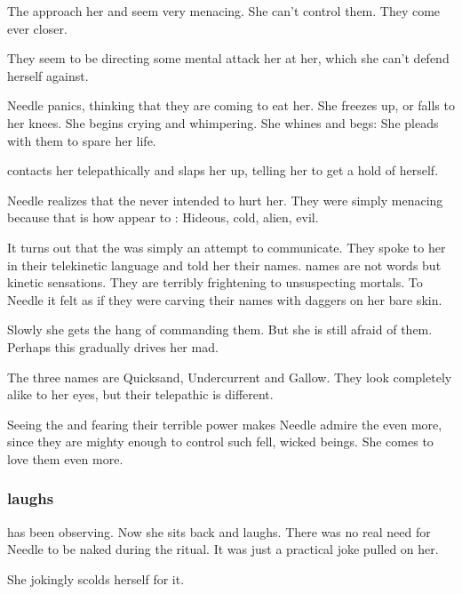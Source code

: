 The \banes{} approach her and seem very menacing. 
She can't control them. 
They come ever closer. 

They seem to be directing some mental attack her at her, which she can't defend herself against. 

Needle panics, thinking that they are coming to eat her. 
She freezes up, or falls to her knees. 
She begins crying and whimpering. 
She whines and begs: 
She pleads with them to spare her life. 

\Achsah{} contacts her telepathically and slaps her up, telling her to get a hold of herself. 

Needle realizes that the \banes{} never intended to hurt her. 
They were simply menacing because that is how \banes{} appear to \humans: 
Hideous, cold, alien, evil. 

It turns out that the \pps{\banes}{}  was simply an attempt to communicate. 
They spoke to her in their telekinetic language and told her their names. 
\Bane{} names are not words but kinetic sensations. 
They are terribly frightening to unsuspecting mortals. 
To Needle it felt as if they were carving their names with daggers on her bare skin. 

Slowly she gets the hang of commanding them. 
But she is still afraid of them. 
Perhaps this gradually drives her mad. 

The three \pps{\banes}{} names are Quicksand, Undercurrent and Gallow. 
They look completely alike to her eyes, but their telepathic  is different. 

Seeing the \banes{} and fearing their terrible power makes Needle admire the \resphain{} even more, since they are mighty enough to control such fell, wicked beings. 
She comes to love them even more. 





\subsubsection{\Achsah{} laughs}
\Achsah{} has been observing. 
Now she sits back and laughs. 
There was no real need for Needle to be naked during the ritual. 
It was just a practical joke \Achsah{} pulled on her. 

She jokingly scolds herself for it. 





